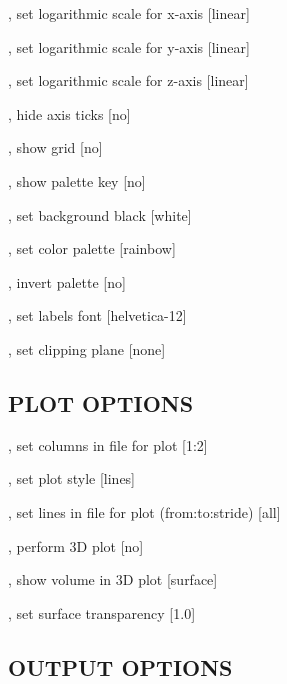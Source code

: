 \begin{Description}

\item[\Opt{-x}, \Opt{--xlog}] set logarithmic scale for x-axis [linear]
\item[\Opt{-y}, \Opt{--ylog}] set logarithmic scale for y-axis [linear]
\item[\Opt{-z}, \Opt{--zlog}] set logarithmic scale for z-axis [linear]
\item[\Opt{-t}, \Opt{--no-ticks}] hide axis ticks [no]
\item[\Opt{-g}, \Opt{--grid}] show grid [no]
\item[\Opt{-k}, \Opt{--key}] show palette key [no]
\item[\Opt{-b}, \Opt{--black}] set background black [white]
\item[\Opt{-p}, \OptArg{--palette}{ name}]  set color palette [rainbow]
\item[\Opt{-n}, \Opt{--negative}] invert palette [no]
\item[\Opt{-f}, \OptArg{--font}{ name}] set labels font [helvetica-12]
\item[\Opt{-c}, \OptArg{--clip}{ name}] set clipping plane [none]

\end{Description}

\subsection{PLOT OPTIONS}

\begin{Description}

\item[\Opt{-u}, \OptArg{--using}{ string}] set columns in file for plot [1:2]
\item[\Opt{-w}, \OptArg{--with}{ string}] set plot style [lines]
\item[\Opt{-s}, \OptArg{--slice }{ string}] set lines in file for plot (from:to:stride) [all]
\item[\Opt{-3}, \Opt{--3D}] perform 3D plot [no]
\item[\Opt{-v}, \Opt{--volume}] show volume in 3D plot [surface]
\item[\Opt{-a}, \OptArg{--alpha }{ value}] set surface transparency [1.0]

\end{Description}

\subsection{OUTPUT OPTIONS}

